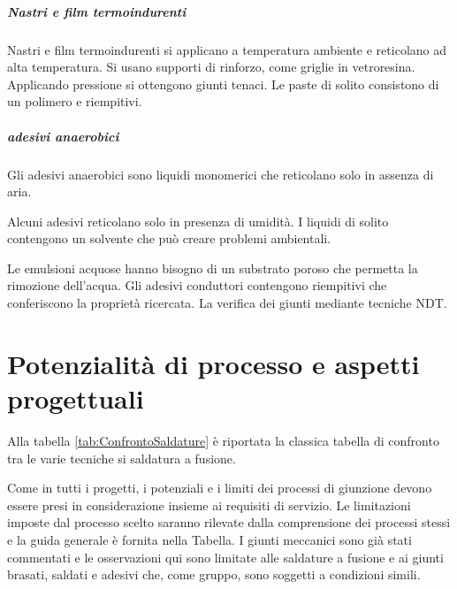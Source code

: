 \paragraph{Nastri e film termoindurenti}
Nastri e film termoindurenti si applicano a temperatura ambiente e reticolano ad alta temperatura.
Si usano supporti di rinforzo, come griglie in vetroresina.
Applicando pressione si ottengono giunti tenaci.
Le paste di solito consistono di un polimero e riempitivi.

\paragraph{adesivi anaerobici}
Gli adesivi anaerobici sono liquidi monomerici che reticolano solo in assenza di aria.

Alcuni adesivi reticolano solo in presenza di umidità. I liquidi di solito contengono un solvente che può creare problemi ambientali.

Le emulsioni acquose hanno bisogno di un substrato poroso che permetta la rimozione dell'acqua.
Gli adesivi conduttori contengono riempitivi che conferiscono la proprietà ricercata.
La verifica dei giunti mediante tecniche \ac{NDT}.

\begin{figure}
\centering
{}\quad
{}
\end{figure}


\chapter{Potenzialità di processo e aspetti progettuali}
Alla tabella \ref{tab:ConfrontoSaldature} è riportata la classica tabella di confronto tra le varie tecniche si saldatura a fusione.

Come in tutti i progetti, i potenziali e i limiti dei processi di giunzione devono essere presi in considerazione insieme ai requisiti di servizio.
Le limitazioni imposte dal processo scelto saranno rilevate dalla comprensione dei processi stessi e la guida generale è fornita nella Tabella.
I giunti meccanici sono già stati commentati e le osservazioni qui sono limitate alle saldature a fusione e ai giunti brasati, saldati e adesivi che, come gruppo, sono soggetti a condizioni simili.

